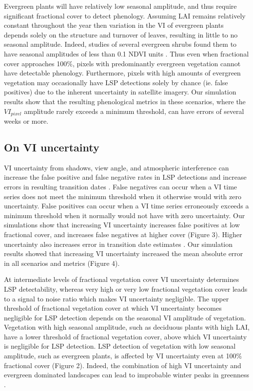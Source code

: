 \documentclass{article}
\begin{document}
Evergreen plants will have relatively low seasonal amplitude, and thus require significant fractional cover to detect phenology. Assuming LAI remains relatively constant throughout the year then variation in the VI of evergreen plants depends solely on the structure and turnover of leaves, resulting in little to no seasonal amplitude. Indeed, studies of several evergreen shrubs found them to have seasonal amplitudes of less than 0.1 NDVI units \cite{gamon1995, stylinski2002}. Thus even when fractional cover approaches 100\%, pixels with predominantly evergreen vegetation cannot have detectable phenology. Furthermore, pixels with high amounts of evergreen vegetation may occasionally have LSP detections solely by chance (ie. false positives) due to the inherent uncertainty in satellite imagery. Our simulation results show that the resulting phenological metrics in these scenarios, where the $VI_{pixel}$ amplitude rarely exceeds a minimum threshold, can have errors of several weeks or more.

\subsection{On VI uncertainty}
VI uncertainty from shadows, view angle, and atmospheric interference can increase the false positive and false negative rates in LSP detections and increase errors in resulting transition dates \cite{ma2013}. False negatives can occur when a VI time series does not meet the minimum threshold when it otherwise would with zero uncertainty. False positives can occur when a VI time series erroneously exceeds a minimum threshold when it normally would not have with zero uncertainty. Our simulations show that increasing VI uncertainty increases false positives at low fractional cover, and increases false negatives at higher cover (Figure 3). Higher uncertainty also increases error in transition date estimates \cite{ma-huete2019}. Our simulation results showed that increasing VI uncertainty increased the mean absolute error in all scenarios and metrics (Figure 4).

At intermediate levels of fractional vegetation cover VI uncertainty determines LSP detectability, whereas very high or very low fractional vegetation cover leads to a signal to noise ratio which makes VI uncertainty negligible. The upper threshold of fractional vegetation cover at which VI uncertainty becomes negligible for LSP detection depends on the seasonal VI amplitude of vegetation. Vegetation with high seasonal amplitude, such as deciduous plants with high LAI, have a lower threshold of fractional vegetation cover, above which VI uncertainty is negligible for LSP detection. LSP detection of vegetation with low seasonal amplitude, such as evergreen plants, is affected by VI uncertainty even at 100\% fractional cover (Figure 2). Indeed, the combination of high VI uncertainty and evergreen dominated landscapes can lead to improbable winter peaks in greenness \cite{norris2020}. 
\end{document}
